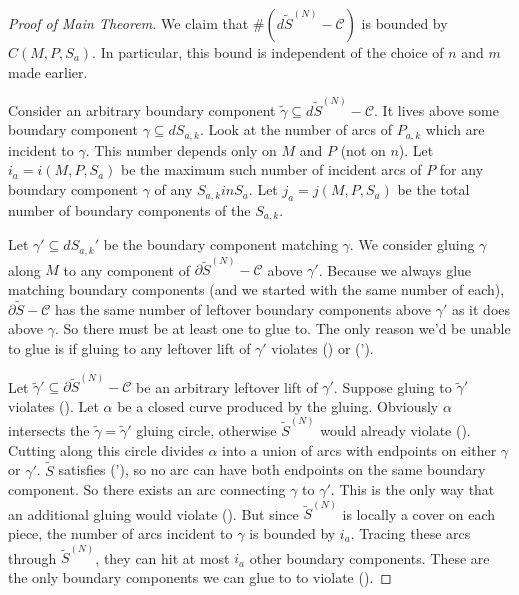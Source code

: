 \documentclass[12pt]{amsart}
\theoremstyle{definition}
\theoremstyle{remark}
\newcommand{\bd}{\partial}
\newcommand{\cin}{\subseteq}
\newcommand{\cC}{\mathcal{C}}
\begin{document}
\begin{proof}[Proof of Main Theorem]

We claim that $\#(d\widetilde{S}^{(N)} - \cC)$ is bounded by $C(M,P,S_a)$.  In
particular, this bound is independent of the choice of $n$ and $m$ made
earlier.


Consider an arbitrary boundary component $\widetilde{\gamma} \cin
d\widetilde{S}^{(N)} - \cC$.  It lives above some boundary component $\gamma
\cin dS_{a,k}$. Look at the number of arcs of $P_{a,k}$ which are incident to
$\gamma$. This number depends only on $M$ and $P$ (not on $n$). Let $i_a
= i(M,P,S_a)$ be the maximum such number of incident arcs of $P$ for any
boundary component $\gamma$ of any $S_{a,k} in S_a$. Let $j_a = j(M,P,S_a)$ be
the total number of boundary components of the $S_{a,k}$.

Let $\gamma' \cin dS_{a,k}'$ be the boundary component matching $\gamma$. We
consider gluing $\gamma$ along $M$ to any component of $\bd\widetilde{S}^{(N)}
- \cC$ above $\gamma'$.  Because we always glue matching boundary components
(and we started with the same number of each), $\bd\widetilde{S} - \cC$ has the
same number of leftover boundary components above $\gamma'$ as it does above
$\gamma$. So there must be at least one to glue to.  The only reason we'd be
unable to glue is if gluing to any leftover lift of $\gamma'$ violates (\dag) or
(\dag').

Let $\widetilde{\gamma}' \cin \bd\widetilde{S}^{(N)} - \cC$ be an arbitrary
leftover lift of $\gamma'$.  Suppose gluing to $\widetilde{\gamma}'$ violates
(\dag). Let $\alpha$ be a closed curve produced by the gluing.  Obviously
$\alpha$ intersects the $\widetilde{\gamma} = \widetilde{\gamma}'$ gluing
circle, otherwise $\widetilde{S}^{(N)}$ would already violate (\dag).  Cutting
along this circle divides $\alpha$ into a union of arcs with endpoints on
either $\gamma$ or $\gamma'$.  $\widetilde{S}$ satisfies (\dag'), so no arc can
have both endpoints on the same boundary component. So there exists an arc
connecting $\gamma$ to $\gamma'$. This is the only way that an additional
gluing would violate (\dag). But since $\widetilde{S}^{(N)}$ is locally a cover
on each piece, the number of arcs incident to $\gamma$ is bounded by $i_a$.
Tracing these arcs through $\widetilde{S}^{(N)}$, they can hit at most $i_a$
other boundary components.  These are the only boundary components we can glue
to to violate (\dag).


\end{proof}
\end{document}
